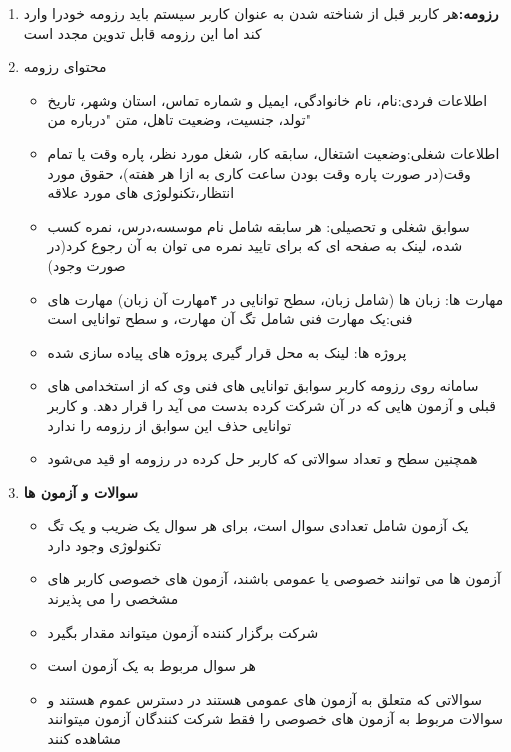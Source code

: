 \documentclass{article}
\begin{document}
\begin{enumerate}[\hspace{1cm}1.]
        \item \textbf{رزومه:}هر کاربر قبل از شناخته شدن به عنوان کاربر سیستم باید رزومه خودرا وارد کند اما این رزومه قابل تدوین مجدد است
        \item محتوای رزومه
        \begin{itemize}
            \item اطلاعات فردی:نام، نام خانوادگی، ایمیل و شماره تماس، استان وشهر، تاریخ تولد، جنسیت، وضعیت تاهل، متن "درباره من"
            \item اطلاعات شغلی:وضعیت اشتغال، سابقه کار، شغل مورد نظر، پاره وقت یا تمام وقت(در صورت پاره وقت بودن ساعت کاری به ازا هر هفته)، حقوق مورد انتظار،تکنولوژی های مورد علاقه
            \item سوابق شغلی و تحصیلی: هر سابقه شامل نام موسسه،درس، نمره کسب شده، لینک به صفحه ای که برای تایید نمره می توان به آن رجوع کرد(در صورت وجود)
            \item مهارت ها: زبان ها (شامل زبان، سطح توانایی در ۴مهارت آن زبان) مهارت های فنی:یک مهارت فنی شامل تگ آن مهارت، و سطح توانایی است
            \item پروژه ها: لینک به محل قرار گیری پروژه های پیاده سازی شده
            \item سامانه روی رزومه کاربر سوابق توانایی های فنی وی که از استخدامی های قبلی و آزمون هایی که در آن شرکت کرده بدست می آید را قرار دهد. و کاربر توانایی حذف این سوابق از رزومه را ندارد     
            \item همچنین سطح و تعداد سوالاتی که کاربر حل کرده در رزومه او قید می‌شود
        \end{itemize}
        
        \item \textbf{سوالات و آزمون ها}
        \begin{itemize}
            \item  یک آزمون شامل تعدادی سوال است، برای هر سوال یک ضریب و یک تگ تکنولوژی وجود دارد
            \item آزمون ها می توانند خصوصی یا عمومی باشند، آزمون های خصوصی کاربر های مشخصی را می پذیرند
            \item شرکت برگزار کننده آزمون میتواند مقدار  بگیرد
            
            \item هر سوال مربوط به یک آزمون است
            \item سوالاتی که متعلق به آزمون های عمومی هستند در دسترس عموم هستند و سوالات مربوط به آزمون های خصوصی را فقط شرکت کنندگان آزمون میتوانند مشاهده کنند
        \end{itemize}
        

\end{enumerate}
\end{document}
